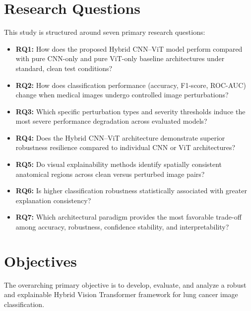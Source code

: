 \documentclass[conference]{IEEEtran}
\begin{document}
\section{Research Questions}
\label{sec:research_questions}

This study is structured around seven primary research questions:
\begin{itemize}
    \item \textbf{RQ1:} How does the proposed Hybrid CNN--ViT model perform compared with pure CNN-only and pure ViT-only baseline architectures under standard, clean test conditions?
    \item \textbf{RQ2:} How does classification performance (accuracy, F1-score, ROC-AUC) change when medical images undergo controlled image perturbations?
    \item \textbf{RQ3:} Which specific perturbation types and severity thresholds induce the most severe performance degradation across evaluated models?
    \item \textbf{RQ4:} Does the Hybrid CNN--ViT architecture demonstrate superior robustness resilience compared to individual CNN or ViT architectures?
    \item \textbf{RQ5:} Do visual explainability methods identify spatially consistent anatomical regions across clean versus perturbed image pairs?
    \item \textbf{RQ6:} Is higher classification robustness statistically associated with greater explanation consistency?
    \item \textbf{RQ7:} Which architectural paradigm provides the most favorable trade-off among accuracy, robustness, confidence stability, and interpretability?
\end{itemize}

\section{Objectives}
\label{sec:objectives}

The overarching primary objective is to develop, evaluate, and analyze a robust and explainable Hybrid Vision Transformer framework for lung cancer image classification. 
\end{document}
